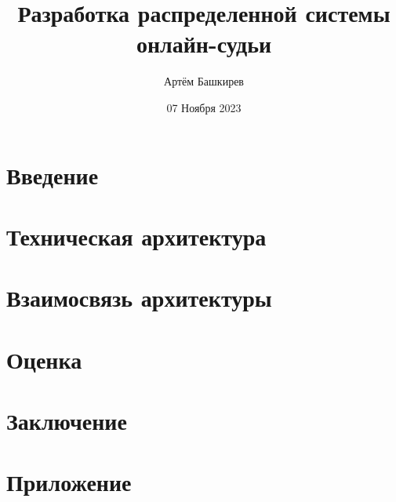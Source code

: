 \documentclass[a4paper, 12pt]{article}
\title{Разработка распределенной системы онлайн-судьи}
\author{Артём Башкирев}
\date{07 Ноября 2023}
\begin{document}
\maketitle
\thispagestyle{empty}

\newpage
    \tableofcontents
\newpage


    \section{Введение}
    
\newpage

    \section{Техническая архитектура}
    
\newpage

    \section{Взаимосвязь архитектуры}
    
\newpage

    \section{Оценка}
    
\newpage

    \section{Заключение}
    
\newpage

    \section{Приложение}
    
\end{document}
